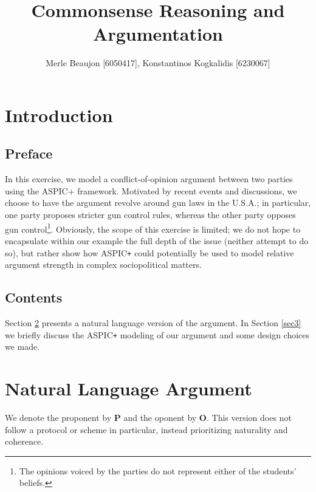 \documentclass[]{article}
\begin{document}
\author{Merle Beaujon [6050417], Konstantinos Kogkalidis [6230067]}
\title{Commonsense Reasoning and Argumentation}
\maketitle
\section{Introduction}
\subsection{Preface}
In this exercise, we model a conflict-of-opinion argument between two parties using the ASPIC+ framework. Motivated by recent events and discussions, we choose to have the argument revolve around gun laws in the U.S.A.; in particular, one party proposes stricter gun control rules, whereas the other party opposes gun control\footnote{The opinions voiced by the parties do not represent either of the students' beliefs.}. Obviously, the scope of this exercise is limited; we do not hope to encapsulate within our example the full depth of the issue (neither attempt to do so), but rather show how ASPIC\texttt{+}\cite{ASPIC} could potentially be used to model relative argument strength in complex sociopolitical matters.
\subsection{Contents}
Section \ref{sec2} presents a natural language version of the argument. In Section \ref{sec3} we briefly discuss the ASPIC\texttt{+} modeling of our argument and some design choices we made. 

\section{Natural Language Argument}\label{sec2}
We denote the proponent by \textbf{P} and the oponent by \textbf{O}. This version does not follow a protocol or scheme in particular, instead prioritizing naturality and coherence.
\end{document}
